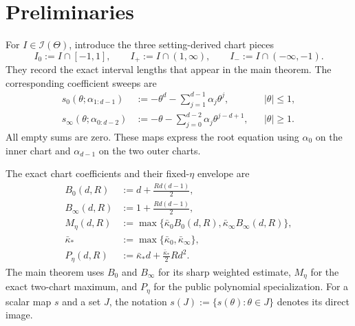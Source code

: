 \section{Preliminaries}

For $I\in\mathcal I(\Theta)$, introduce the three setting-derived chart
pieces
\[
I_0:=I\cap[-1,1],\qquad
I_+:=I\cap(1,\infty),\qquad
I_-:=I\cap(-\infty,-1).
\]
They record the exact interval lengths that appear in the main theorem.  The
corresponding coefficient sweeps are
\[
\begin{aligned}
s_0(\theta;\alpha_{1:d-1})
&:=-\theta^d-\sum_{j=1}^{d-1}\alpha_j\theta^j,
&& |\theta|\leq1,\\
s_\infty(\theta;\alpha_{0:d-2})
&:=-\theta-\sum_{j=0}^{d-2}\alpha_j\theta^{j-d+1},
&& |\theta|\geq1.
\end{aligned}
\]
All empty sums are zero.  These maps express the root equation using
$\alpha_0$ on the inner chart and $\alpha_{d-1}$ on the two outer charts.

The exact chart coefficients and their fixed-$\eta$ envelope are
\[
\begin{aligned}
B_0(d,R)&:=d+\frac{Rd(d-1)}2,\\
B_\infty(d,R)&:=1+\frac{Rd(d-1)}2,\\
M_\eta(d,R)&:=\max\{\bar\kappa_0B_0(d,R),
                         \bar\kappa_\infty B_\infty(d,R)\},\\
\bar\kappa_*&:=\max\{\bar\kappa_0,\bar\kappa_\infty\},\\
P_\eta(d,R)&:=\bar\kappa_*d+\frac{\bar\kappa_*}{2}Rd^2.
\end{aligned}
\]
The main theorem uses $B_0$ and $B_\infty$ for its sharp weighted estimate,
$M_\eta$ for the exact two-chart maximum, and $P_\eta$ for the public
polynomial specialization.  For a scalar map $s$ and a set $J$, the notation
$s(J):=\{s(\theta):\theta\in J\}$ denotes its direct image.
